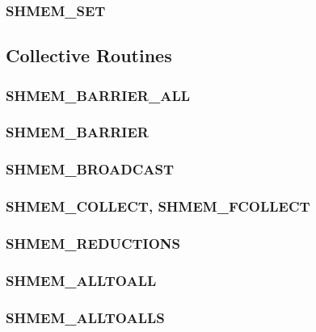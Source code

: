 \documentclass[10pt]{book}
\begin{document}
\subsubsection{\textbf{SHMEM\_SET}}\label{subsec:shmem_set}






\subsection{Collective Routines}\label{subsec:coll}


\subsubsection{\textbf{SHMEM\_BARRIER\_ALL}}\label{subsec:shmem_barrier_all}


\subsubsection{\textbf{SHMEM\_BARRIER}}\label{subsec:shmem_barrier}


\subsubsection{\textbf{SHMEM\_BROADCAST}}\label{subsec:shmem_broadcast}


\subsubsection{\textbf{SHMEM\_COLLECT, SHMEM\_FCOLLECT}}\label{subsec:shmem_collect}


\subsubsection{\textbf{SHMEM\_REDUCTIONS}}\label{subsec:shmem_reductions}


\subsubsection{\textbf{SHMEM\_ALLTOALL}}\label{subsec:shmem_alltoall}


\subsubsection{\textbf{SHMEM\_ALLTOALLS}}\label{subsec:shmem_alltoalls}

\end{document}
